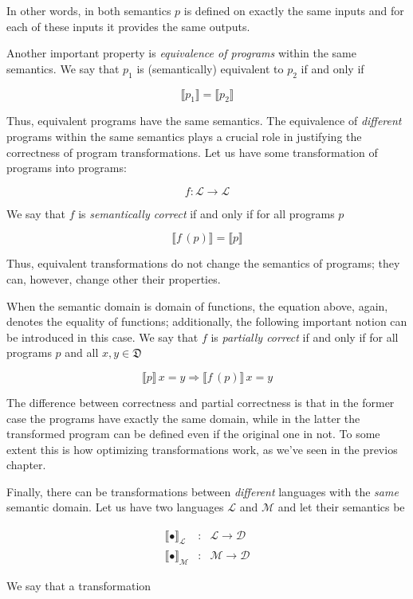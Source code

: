 \documentclass{article}
\newcommand{\sembr}[1]{\llbracket{#1}\rrbracket}
\newcommand{\ph}{{\phantom{x}}}
\begin{document}
In other words, in both semantics $p$ is defined on exactly the same inputs and for each of these inputs it provides the same outputs.

Another important property is \emph{equivalence of programs} within the same semantics. We say that $p_1$ is (semantically) equivalent to $p_2$ if
and only if

\[
\sembr{p_1}=\sembr{p_2}
\]

Thus, equivalent programs have the same semantics. The equivalence of \emph{different} programs within the same semantics plays a crucial
role in justifying the correctness of program transformations. Let us have some transformation of programs into programs:

\[
f : \mathcal{L}\to\mathcal{L}
\]

We say that $f$ is \emph{semantically correct} if and only if for all programs $p$

\[
\sembr{f\,(p)}=\sembr{p}
\]

Thus, equivalent transformations do not change the semantics of programs; they can, however, change other their properties.

When the semantic domain is domain of functions, the equation above, again, denotes the equality of functions; additionally,
the following important notion can be introduced in this case. We say that $f$ is \emph{partially correct} if and only if
for all programs $p$ and all $x, y\in\mathfrak{D}$

\[
\sembr{p}\,x=y\Rightarrow\sembr{f\,(p)}\,x=y
\]

The difference between correctness and partial correctness is that in the former case the programs have exactly the same domain, while in
the latter the transformed program can be defined even if the original one in not. To some extent this is how
optimizing transformations work, as we've seen in the previos chapter.

Finally, there can be transformations between \emph{different} languages with the \emph{same} semantic domain. Let us have two languages $\mathcal{L}$ and $\mathcal{M}$
and let their semantics be

\[
\begin{array}{rcl}
  \sembr{\bullet}^\ph_\mathcal{L} & : & \mathcal{L}\to\mathcal{D}\\
  \sembr{\bullet}^\ph_\mathcal{M} & : & \mathcal{M}\to\mathcal{D}
\end{array}
\]

We say that a transformation
\end{document}
